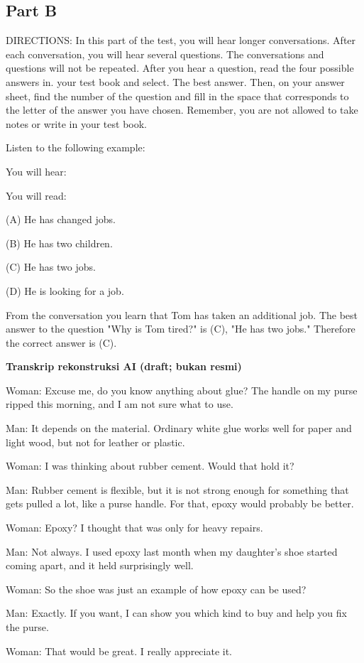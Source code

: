 \documentclass[12pt]{article}
\begin{document}
\subsection*{Part B}
DIRECTIONS: In this part of the test, you will hear longer conversations. After each conversation, you will hear several questions. The conversations and questions will not be repeated. After you hear a question, read the four possible answers in. your test book and select. The best answer. Then, on your answer sheet, find the number of the question and fill in the space that corresponds to the letter of the answer you have chosen. Remember, you are not allowed to take notes or write in your test book.\par
\begin{exampleblock}
Listen to the following example:\par
You will hear:\par
You will read:\par
(A) He has changed jobs.\par
(B) He has two children.\par
(C) He has two jobs.\par
(D) He is looking for a job.\par
From the conversation you learn that Tom has taken an additional job. The best answer to the question "Why is Tom tired?" is (C), "He has two jobs." Therefore the correct answer is (C).\par
\end{exampleblock}
\begin{exampleblock}
\textbf{Transkrip rekonstruksi AI (draft; bukan resmi)}\par
Woman: Excuse me, do you know anything about glue? The handle on my purse ripped this morning, and I am not sure what to use.\par
Man: It depends on the material. Ordinary white glue works well for paper and light wood, but not for leather or plastic.\par
Woman: I was thinking about rubber cement. Would that hold it?\par
Man: Rubber cement is flexible, but it is not strong enough for something that gets pulled a lot, like a purse handle. For that, epoxy would probably be better.\par
Woman: Epoxy? I thought that was only for heavy repairs.\par
Man: Not always. I used epoxy last month when my daughter's shoe started coming apart, and it held surprisingly well.\par
Woman: So the shoe was just an example of how epoxy can be used?\par
Man: Exactly. If you want, I can show you which kind to buy and help you fix the purse.\par
Woman: That would be great. I really appreciate it.\par
\end{exampleblock}
\end{document}
